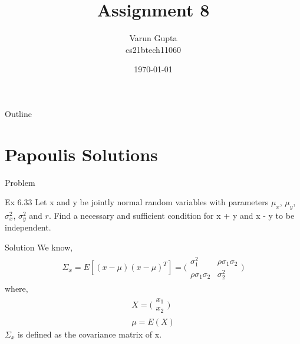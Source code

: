 \documentclass{beamer}
\title{Assignment 8}
\author{Varun Gupta \\ cs21btech11060}
\date{\today}
\begin{document}
\begin{frame}
    \titlepage
\end{frame}

\logo{}


\begin{frame}{Outline}
    \tableofcontents
\end{frame}
\section{Papoulis Solutions}
\begin{frame}{Problem}
    \begin{block}{Ex 6.33}
        Let x and y be jointly normal random variables with parameters $\mu_x$, $\mu_y$, $\sigma_x^2$, $\sigma_y^2$ and $r$. Find
        a necessary and sufficient condition for x + y and x - y to be independent.
    \end{block}
\end{frame}
\begin{frame}{Solution}
    We know,
    \begin{align}
        \Sigma_x = E[(x-\mu)(x-\mu)^T] = \Bigg(\begin{matrix}
            \sigma_1^2 &\rho \sigma_1 \sigma_2 \\
            \rho \sigma_1 \sigma_2 &\sigma_2^2
        \end{matrix}\Bigg)
    \end{align}
    where,
    \begin{align}
        X = \Bigg(\begin{matrix}
            x_1 \\
            x_2
        \end{matrix} \Bigg) \\
        \mu = E(X)
    \end{align}
    $\Sigma_x$ is defined as the covariance matrix of x.
\end{frame}
\end{document}
